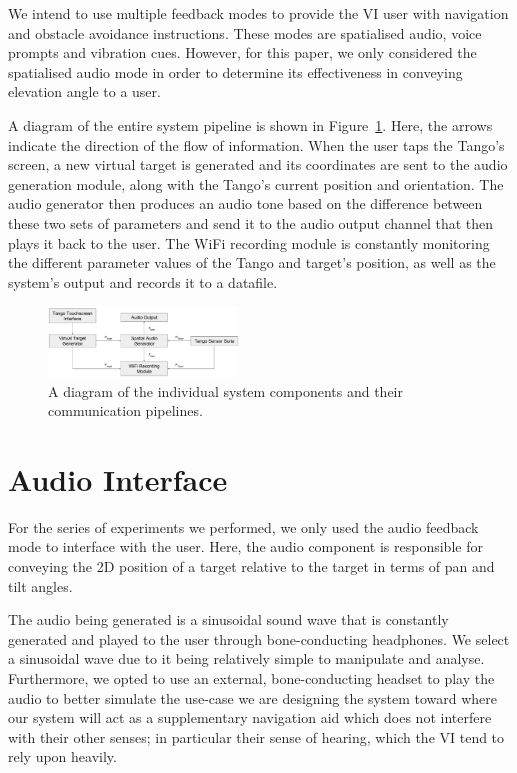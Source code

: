 \documentclass[format=sigconf, review=true, screen=true, anonymous=true]{acmart}
\begin{document}
We intend to use multiple feedback modes to provide the VI user with navigation and obstacle avoidance instructions. These modes are spatialised audio, voice prompts and vibration cues. However, for this paper, we only considered the spatialised audio mode in order to determine its effectiveness in conveying elevation angle to a user.

A diagram of the entire system pipeline is shown in Figure~\ref{fig:pipeline}. Here, the arrows indicate the direction of the flow of information. When the user taps the Tango's screen, a new virtual target is generated and its coordinates are sent to the audio generation module, along with the Tango's current position and orientation. The audio generator then produces an audio tone based on the difference between these two sets of parameters and send it to the audio output channel that then plays it back to the user. The WiFi recording module is constantly monitoring the different parameter values of the Tango and target's position, as well as the system's output and records it to a datafile. 

\begin{figure}
  \centering
  \includegraphics[width=0.45\textwidth]{figures/pipeline.pdf}
  \caption{A diagram of the individual system components and their communication pipelines. }
  \label{fig:pipeline}
\end{figure}

\section{Audio Interface}
\label{sec:interface}

For the series of experiments we performed, we only used the audio feedback mode to interface with the user. Here, the audio component is responsible for conveying the 2D position of a target relative to the target in terms of pan and tilt angles. 

The audio being generated is a sinusoidal sound wave that is constantly generated and played to the user through bone-conducting headphones. We select a sinusoidal wave due to it being relatively simple to manipulate and analyse. Furthermore, we opted to use an external, bone-conducting headset to play the audio to better simulate the use-case we are designing the system toward where our system will act as a supplementary navigation aid which does not interfere with their other senses; in particular their sense of hearing, which the VI tend to rely upon heavily. 
\end{document}
